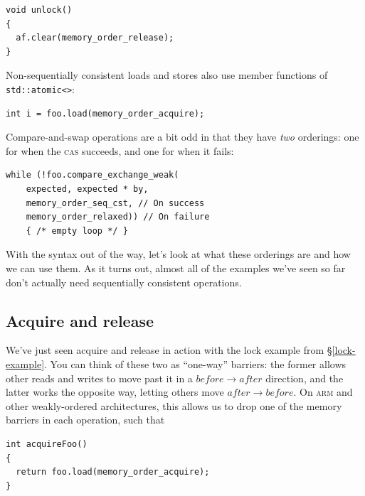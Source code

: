 \documentclass[fontsize=10pt, numbers=endperiod]{scrartcl}
\newcommand{\codesize}{\fontsize{10pt}{12pt}}
\newcommand{\secref}[1]{\hyperref[#1]{\textsc{\S}\ref*{#1}}}
\newenvironment{colfigure}
  {\par\vspace{1\baselineskip minus 0.5\baselineskip}\noindent\minipage{\linewidth}}
  {\endminipage\vspace*{1\baselineskip minus 0.7\baselineskip}}
\begin{document}
\begin{multicols}{2}
\begin{colfigure}
\begin{verbatim}
void unlock()
{
  af.clear(memory_order_release);
}
\end{verbatim}
\end{colfigure}
Non-sequentially consistent loads and stores also use member functions of
\texttt{std::atomic<>}:
\begin{colfigure}
\begin{verbatim}
int i = foo.load(memory_order_acquire);
\end{verbatim}
\end{colfigure}
Compare-and-swap operations are a bit odd in that they have \emph{two}
orderings: one for when the \textsc{cas} succeeds, and one for when it fails:
\begin{colfigure}
\begin{verbatim}
while (!foo.compare_exchange_weak(
    expected, expected * by,
    memory_order_seq_cst, // On success
    memory_order_relaxed)) // On failure
    { /* empty loop */ }
\end{verbatim}
\end{colfigure}

With the syntax out of the way,
let's look at what these orderings are and how we can use them.
As it turns out, almost all of the examples we've seen so far don't actually
need sequentially consistent operations.

\subsection{Acquire and release}

We've just seen acquire and release in action with the
lock example from \secref{lock-example}.
You can think of these two as ``one-way'' barriers:
the former allows other reads and writes to move past it in a $before \to after$
direction, and the latter works the opposite way,
letting others move $after \to before$.
On \textsc{arm} and other weakly-ordered architectures, this allows us to drop
one of the memory barriers in each operation, such that

\begin{colfigure}
\begin{verbatim}
int acquireFoo()
{
  return foo.load(memory_order_acquire);
}


\end{verbatim}
\end{colfigure}
\end{multicols}
\end{document}
